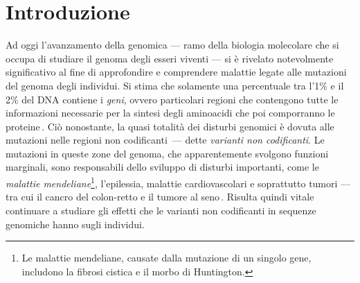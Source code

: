 
\chapter{Introduzione}\label{chp:introduction}

Ad oggi l'avanzamento della genomica — ramo della biologia molecolare che si occupa di studiare il genoma degli esseri viventi — si è rivelato notevolmente significativo al fine di approfondire e comprendere malattie legate alle mutazioni del genoma degli individui. Si stima che solamente una percentuale tra l'1\% e il 2\% del \acs{DNA} contiene i \textsl{geni}, ovvero particolari regioni che contengono tutte le informazioni necessarie per la sintesi degli aminoacidi che poi comporranno le proteine\,\cite{sahu2011identification, pollard2022cell}. Ciò nonostante, la quasi totalità dei disturbi genomici è dovuta alle mutazioni nelle regioni non codificanti\,\cite{zhang2015non} — dette \textsl{varianti non codificanti}. Le mutazioni in queste zone del genoma, che apparentemente svolgono funzioni marginali, sono responsabili dello sviluppo di disturbi importanti, come le \textsl{malattie mendeliane}\footnote{Le malattie mendeliane, causate dalla mutazione di un singolo gene, includono la fibrosi cistica e il morbo di Huntington.}, l'epilessia, malattie cardiovascolari e soprattutto tumori — tra cui il cancro del colon-retto e il tumore al seno\,\cite{french2020role, chial2008mendelian, pagni2022non, kapoor2014enhancer, zhang2015non, khurana2016role, tian2019systematic, bojesen2013multiple, michailidou2017association}. Risulta quindi vitale continuare a studiare gli effetti che le varianti non codificanti in sequenze genomiche hanno sugli individui.

